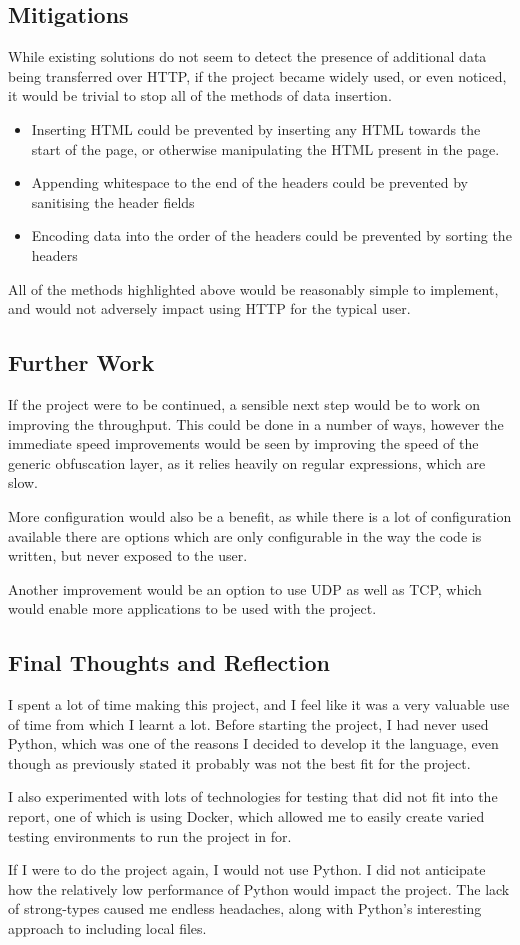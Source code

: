 \subsection{Mitigations}
While existing solutions do not seem to detect the presence of additional data being transferred over HTTP, if the project became widely used, or even noticed, it would be trivial to stop all of the methods of data insertion.\par
\begin{itemize}
    \item Inserting HTML could be prevented by inserting any HTML towards the start of the page, or otherwise manipulating the HTML present in the page.
    \item Appending whitespace to the end of the headers could be prevented by sanitising the header fields
    \item Encoding data into the order of the headers could be prevented by sorting the headers
\end{itemize}
All of the methods highlighted above would be reasonably simple to implement, and would not adversely impact using HTTP for the typical user.


\subsection{Further Work}
If the project were to be continued, a sensible next step would be to work on improving the throughput. This could be done in a number of ways, however the immediate speed improvements would be seen by improving the speed of the generic obfuscation layer, as it relies heavily on regular expressions, which are slow.\par
More configuration would also be a benefit, as while there is a lot of configuration available there are options which are only configurable in the way the code is written, but never exposed to the user.\par
Another improvement would be an option to use UDP as well as TCP, which would enable more applications to be used with the project.
\subsection{Final Thoughts and Reflection}
I spent a lot of time making this project, and I feel like it was a very valuable use of time from which I learnt a lot. Before starting the project, I had never used Python, which was one of the reasons I decided to develop it the language, even though as previously stated it probably was not the best fit for the project.\par
I also experimented with lots of technologies for testing that did not fit into the report, one of which is using Docker, which allowed me to easily create varied testing environments to run the project in for.\par
If I were to do the project again, I would not use Python. I did not anticipate how the relatively low performance of Python would impact the project. The lack of strong-types caused me endless headaches, along with Python's interesting approach to including local files.
